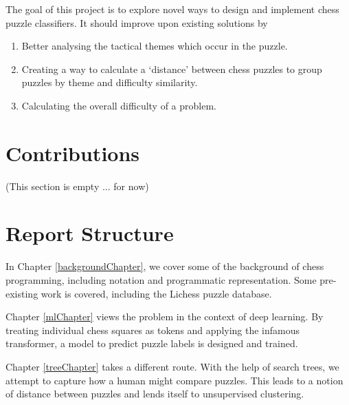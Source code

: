The goal of this project is to explore novel ways to design and implement chess
puzzle classifiers. It should improve upon existing solutions by

\begin{enumerate}
    \item Better analysing the tactical themes which occur in the puzzle.
    \item Creating a way to calculate a `distance' between chess puzzles to 
    group puzzles by theme and difficulty similarity.
    \item Calculating the overall difficulty of a problem.
\end{enumerate}

\section{Contributions}

(This section is empty ... for now)

\section{Report Structure}

In Chapter \ref{backgroundChapter}, we cover some of the background of chess
programming, including notation and programmatic representation. Some
pre-existing work is covered, including the Lichess puzzle database.

Chapter \ref{mlChapter} views the problem in the context of deep learning. By
treating individual chess squares as tokens and applying the infamous
transformer, a model to predict puzzle labels is designed and trained.

Chapter \ref{treeChapter} takes a different route. With the help of search
trees, we attempt to capture how a human might compare puzzles. This leads to a
notion of distance between puzzles and lends itself to unsupervised clustering.


